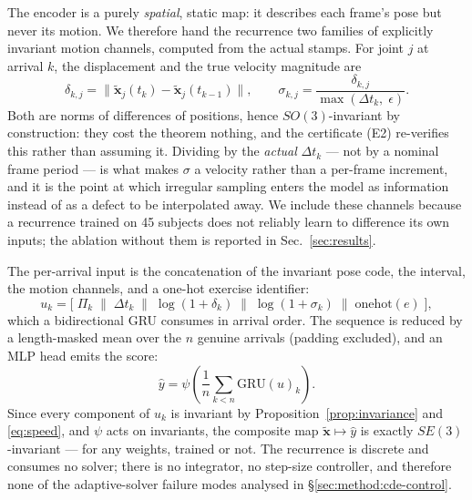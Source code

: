 \documentclass[10pt,journal]{IEEEtran}
\begin{document}
The encoder is a purely \emph{spatial}, static map: it describes each frame's pose but never its
motion. We therefore hand the recurrence two families of explicitly invariant motion channels,
computed from the actual stamps. For joint $j$ at arrival $k$, the displacement and the true velocity
magnitude are
%
\begin{equation}
\label{eq:speed}
\delta_{k,j}=\big\|\tilde{\bm{x}}_j(t_k)-\tilde{\bm{x}}_j(t_{k-1})\big\|,
\qquad
\sigma_{k,j}=\frac{\delta_{k,j}}{\max(\Delta t_k,\;\epsilon)} .
\end{equation}
%
Both are norms of differences of positions, hence $SO(3)$-invariant by construction: they cost the
theorem nothing, and the certificate (E2) re-verifies this rather than assuming it. Dividing by the
\emph{actual} $\Delta t_k$ --- not by a nominal frame period --- is what makes $\sigma$ a
velocity rather than a per-frame increment, and it is the point at which irregular sampling enters
the model as information instead of as a defect to be interpolated away. We include these channels
because a recurrence trained on 45 subjects does not reliably learn to difference its own inputs; the
ablation without them is reported in Sec.~\ref{sec:results}.

The per-arrival input is the concatenation of the invariant pose code, the interval, the motion
channels, and a one-hot exercise identifier:
%
\begin{equation}
\label{eq:input}
u_k=\Big[\;\Pi_k \;\big\|\; \Delta t_k \;\big\|\; \log(1+\delta_k) \;\big\|\; \log(1+\sigma_k)
\;\big\|\; \mathrm{onehot}(e)\;\Big],
\end{equation}
%
which a bidirectional GRU consumes in arrival order. The sequence is reduced by a length-masked mean
over the $n$ genuine arrivals (padding excluded), and an MLP head emits the score:
%
\begin{equation}
\label{eq:head}
\hat y=\psi\!\left(\frac{1}{n}\sum_{k<n}\mathrm{GRU}(u)_k\right).
\end{equation}
%
Since every component of $u_k$ is invariant by Proposition~\ref{prop:invariance} and
\eqref{eq:speed}, and $\psi$ acts on invariants, the composite map
$\tilde{\bm{x}}\mapsto\hat y$ is exactly $SE(3)$-invariant --- for any weights, trained or not. The
recurrence is discrete and consumes no solver; there is no integrator, no step-size controller, and
therefore none of the adaptive-solver failure modes analysed in \S\ref{sec:method:cde-control}.

\end{document}
